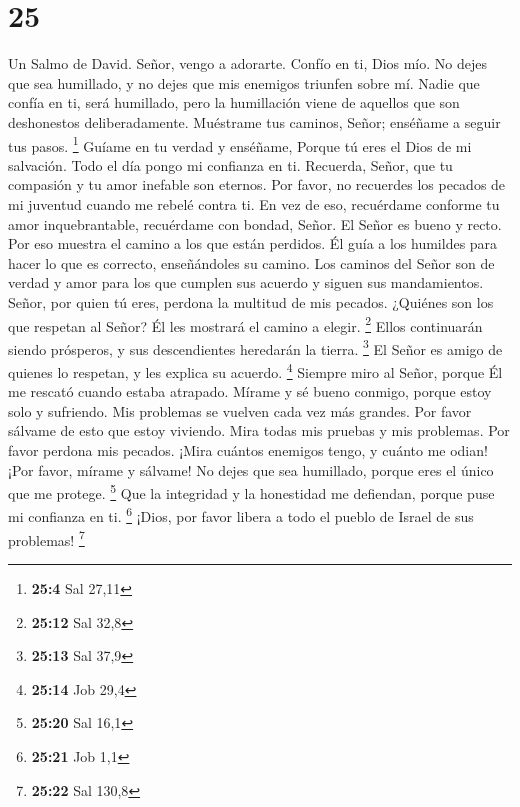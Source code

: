 \hypertarget{section-24}{%
\section{25}\label{section-24}}

Un Salmo de David.  Señor, vengo a adorarte. 
Confío en ti, Dios mío. No dejes que sea humillado, y no dejes que mis
enemigos triunfen sobre mí.  Nadie que confía en ti, será
humillado, pero la humillación viene de aquellos que son deshonestos
deliberadamente.  Muéstrame tus caminos, Señor; enséñame a
seguir tus pasos. \footnote{\textbf{25:4} Sal 27,11}  Guíame
en tu verdad y enséñame, Porque tú eres el Dios de mi salvación. Todo el
día pongo mi confianza en ti.  Recuerda, Señor, que tu
compasión y tu amor inefable son eternos.  Por favor, no
recuerdes los pecados de mi juventud cuando me rebelé contra ti. En vez
de eso, recuérdame conforme tu amor inquebrantable, recuérdame con
bondad, Señor.  El Señor es bueno y recto. Por eso muestra
el camino a los que están perdidos.  Él guía a los humildes
para hacer lo que es correcto, enseñándoles su camino.  Los
caminos del Señor son de verdad y amor para los que cumplen sus acuerdo
y siguen sus mandamientos.  Señor, por quien tú eres,
perdona la multitud de mis pecados.  ¿Quiénes son los que
respetan al Señor? Él les mostrará el camino a elegir. \footnote{\textbf{25:12}
  Sal 32,8}  Ellos continuarán siendo prósperos, y sus
descendientes heredarán la tierra. \footnote{\textbf{25:13} Sal 37,9}
 El Señor es amigo de quienes lo respetan, y les explica su
acuerdo. \footnote{\textbf{25:14} Job 29,4}  Siempre miro
al Señor, porque Él me rescató cuando estaba atrapado. 
Mírame y sé bueno conmigo, porque estoy solo y sufriendo. 
Mis problemas se vuelven cada vez más grandes. Por favor sálvame de esto
que estoy viviendo.  Mira todas mis pruebas y mis
problemas. Por favor perdona mis pecados.  ¡Mira cuántos
enemigos tengo, y cuánto me odian!  ¡Por favor, mírame y
sálvame! No dejes que sea humillado, porque eres el único que me
protege. \footnote{\textbf{25:20} Sal 16,1}  Que la
integridad y la honestidad me defiendan, porque puse mi confianza en ti.
\footnote{\textbf{25:21} Job 1,1}  ¡Dios, por favor libera
a todo el pueblo de Israel de sus problemas! \footnote{\textbf{25:22}
  Sal 130,8}


